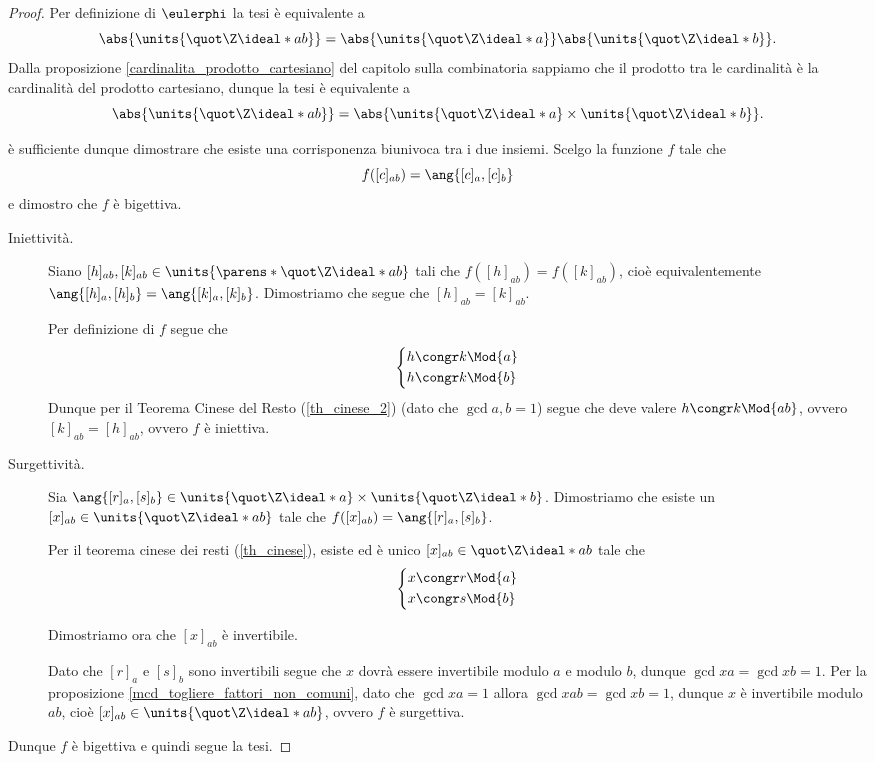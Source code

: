 \begin{proof}
    Per definizione di $\eulerphi$ la tesi è equivalente a \[
        \abs{\units{\Zmod{ab}}} = \abs{\units{\Zmod{a}}}\abs{\units{\Zmod{b}}}.
    \]
    Dalla proposizione \ref{cardinalita_prodotto_cartesiano} del capitolo sulla combinatoria sappiamo che il prodotto tra le cardinalità è la cardinalità del prodotto cartesiano, dunque la tesi è equivalente a \[
        \abs{\units{\Zmod{ab}}} = \abs{\units{\Zmod{a}}\times\units{\Zmod{b}}}.
    \]

    è sufficiente dunque dimostrare che esiste una corrisponenza biunivoca tra i due insiemi. Scelgo la funzione $f$ tale che \[
        f([c]_{ab}) = \ang{[c]_a, [c]_b}    
    \] e dimostro che $f$ è bigettiva.

    \begin{description}
        \item[Iniettività.] Siano $[h]_{ab}, [k]_{ab} \in \units{\parens*{\Zmod{ab}}}$ tali che $f([h]_{ab}) = f([k]_{ab})$, cioè equivalentemente $\ang{[h]_a, [h]_b} = \ang{[k]_a, [k]_b}$. Dimostriamo che segue che $[h]_{ab} = [k]_{ab}$.
        
        Per definizione di $f$ segue che \[
            \left\{
            \begin{alignedat}{1}
                &h \congr k \Mod{a}\\
                &h \congr k \Mod{b}
            \end{alignedat}
            \right.   
        \] Dunque per il Teorema Cinese del Resto (\ref{th_cinese_2}) (dato che $\gcd{a, b} = 1$) segue che deve valere $h \congr k \Mod{ab}$, ovvero $[k]_{ab} = [h]_{ab}$, ovvero $f$ è iniettiva.
        \item[Surgettività.] Sia $\ang{[r]_a, [s]_b} \in \units{\Zmod{a}}\times\units{\Zmod{b}}$. Dimostriamo che esiste un $[x]_{ab} \in \units{\Zmod{ab}}$ tale che $f([x]_{ab}) = \ang{[r]_a, [s]_b}$.
        
        Per il teorema cinese dei resti (\ref{th_cinese}), esiste ed è unico $[x]_{ab} \in \Zmod{ab}$ tale che \[
            \left\{
            \begin{alignedat}{1}
                &x \congr r \Mod{a}\\
                &x \congr s \Mod{b}
            \end{alignedat}
            \right.   
        \] 
        
        Dimostriamo ora che $[x]_{ab}$ è invertibile.
                
        Dato che $[r]_a$ e $[s]_b$ sono invertibili segue che $x$ dovrà essere invertibile modulo $a$ e modulo $b$, dunque $\gcd{x}{a} = \gcd{x}{b} = 1$. Per la proposizione \ref{mcd_togliere_fattori_non_comuni}, dato che $\gcd{x}{a} = 1$ allora $\gcd{x}{ab} = \gcd{x}{b} = 1$, dunque $x$ è invertibile modulo $ab$, cioè $[x]_{ab} \in \units{\Zmod{ab}}$, ovvero $f$ è surgettiva.
    \end{description}

    Dunque $f$ è bigettiva e quindi segue la tesi.
\end{proof}